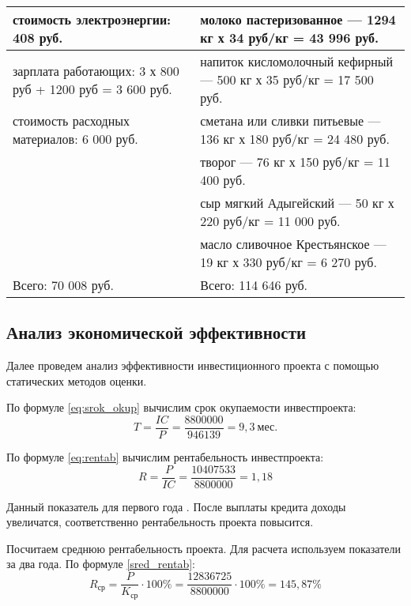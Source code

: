 \begin{table}[]
\begin{tabularx}{\textwidth}{|p{8.05cm}|p{8.05cm}|}
		стоимость электроэнергии: 408 руб.                 & молоко пастеризованное — 1294 кг х 34 руб/кг = 43 996 руб.          \\ \hline
		зарплата работающих: 3 х 800 руб + 1200 руб = 3 600 руб.                                    & напиток кисломолочный кефирный — 500 кг х 35 руб/кг = 17 500 руб.   \\ \hline
		стоимость расходных материалов: 6 000 руб.                & сметана или сливки питьевые — 136 кг х 180 руб/кг = 24 480 руб.     \\ \hline
		                              																& творог — 76 кг х 150 руб/кг = 11 400 руб.                           \\ \cline{2-2}
																									& сыр мягкий Адыгейский — 50 кг х 220 руб/кг = 11 000 руб.            \\ \cline{2-2}
																									& масло сливочное Крестьянское — 19 кг х 330 руб/кг = 6 270 руб.      \\ \hline
		Всего:  70 008 руб.                                                    			 & Всего: 114 646 руб.                                                 \\ \hline
	\end{tabularx}
\end{table}

\newpage\null\thispagestyle{empty}\newpage
\newpage

\subsection*{Анализ экономической эффективности}
Далее проведем анализ эффективности инвестиционного проекта с помощью статических методов оценки.

По формуле \eqref{eq:srok_okup} вычислим срок окупаемости инвестпроекта:
\begin{equation*}
T=\dfrac{IC}{P} = \dfrac{8 800 000}{946 139} = 9,3\  \text{мес.}
\end{equation*}

По формуле \eqref{eq:rentab} вычислим рентабельность инвестпроекта:
\begin{equation*}
R = \dfrac{P}{IC} = \dfrac{10407533}{8800000} = 1,18
\end{equation*}

Данный показатель для первого года . После выплаты кредита доходы увеличатся, соответственно рентабельность проекта повысится.

Посчитаем среднюю рентабельность проекта. Для расчета используем показатели за два года. По формуле \eqref{sred_rentab}:
\begin{equation*}
R_{\text{ср}} = \dfrac{P}{K_{\text{ср}}} \cdot 100\% = \dfrac{12836725}{8800000} \cdot 100\% = 145,87\%
\end{equation*}

